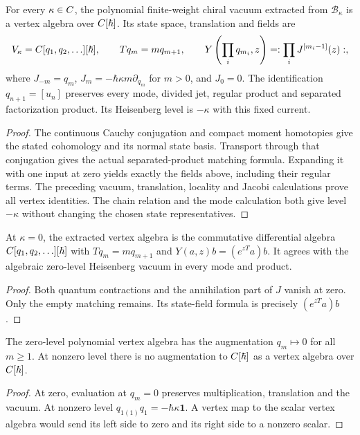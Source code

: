 \begin{theorem}
\label{thm:bf-current-all-levels}
For every $\kappa\in C$, the polynomial finite-weight chiral vacuum
extracted from $\mathcal B_\kappa$ is a vertex algebra over
$C[\hbar]$.  Its state space, translation and fields are
\[
 V_\kappa=C[q_1,q_2,\ldots][\hbar],\qquad
 Tq_m=mq_{m+1},\qquad
 Y\left(\prod_iq_{m_i},z\right)=:\prod_iJ^{[m_i-1]}(z):,
\]
where $J_{-m}=q_m$, $J_m=-\hbar\kappa m\partial_{q_m}$ for $m>0$,
and $J_0=0$.  The identification $q_{n+1}=[u_n]$ preserves every
mode, divided jet, regular product and separated factorization
product.  Its Heisenberg level is $-\kappa$ with this fixed current.
\end{theorem}
\begin{proof}
The continuous Cauchy conjugation and compact moment homotopies give
the stated cohomology and its normal state basis.  Transport through
that conjugation gives the actual separated-product matching formula.
Expanding it with one input at zero yields exactly the fields above,
including their regular terms.  The preceding vacuum, translation,
locality and Jacobi calculations prove all vertex identities.
The chain relation and the mode calculation both give level
$-\kappa$ without changing the chosen state representatives.
\end{proof}

\begin{theorem}
\label{thm:bf-zero-current}
At $\kappa=0$, the extracted vertex algebra is the commutative
differential algebra $C[q_1,q_2,\ldots][\hbar]$ with
$Tq_m=mq_{m+1}$ and $Y(a,z)b=(e^{zT}a)b$.  It agrees with the
algebraic zero-level Heisenberg vacuum in every mode and product.
\end{theorem}
\begin{proof}
Both quantum contractions and the annihilation part of $J$ vanish
at zero.  Only the empty matching remains.  Its state-field formula
is precisely $(e^{zT}a)b$.
\end{proof}

\begin{corollary}
The zero-level polynomial vertex algebra has the augmentation
$q_m\mapsto0$ for all $m\ge1$.  At nonzero level there is no
augmentation to $C[\hbar]$ as a vertex algebra over $C[\hbar]$.
\end{corollary}
\begin{proof}
At zero, evaluation at $q_m=0$ preserves multiplication, translation
and the vacuum.  At nonzero level $q_{1(1)}q_1=-\hbar\kappa\mathbf1$.
A vertex map to the scalar vertex algebra would send its left side
to zero and its right side to a nonzero scalar.
\end{proof}

